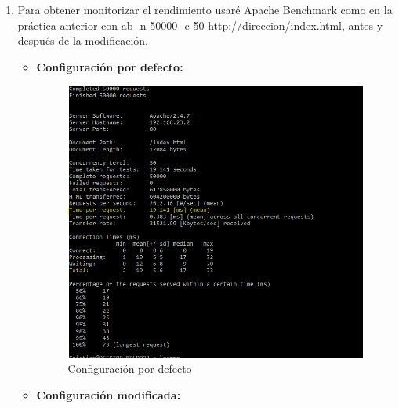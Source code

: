 \begin{enumerate}[label=(\alph*)]
\item Para obtener  monitorizar el rendimiento usaré Apache Benchmark como en la práctica anterior con ab -n 50000 -c 50 http://direccion/index.html, antes y después de la modificación.

\begin{itemize}
	\item \textbf{Configuración por defecto:}
	
	\begin{figure}[H] %
		\centering
		\includegraphics[scale=0.5]{pics/111}  %
		\caption{Configuración por defecto} \label{fig:7}
	\end{figure}
	
	\item \textbf{Configuración modificada:}
	

\end{itemize}
\end{enumerate}
